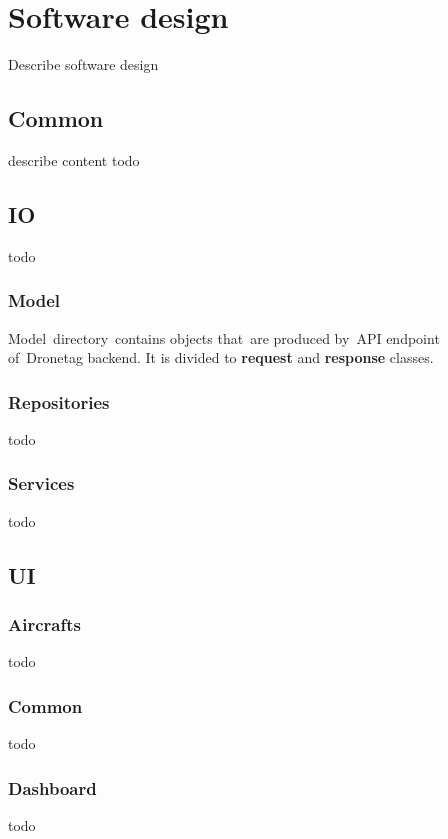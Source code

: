\chapter{Software design}\label{ch:software-design}
Describe software design

\section{Common}\label{sec:common}
describe content
todo

\section{IO}\label{sec:io}
todo

\subsection{Model}\label{subsec:model}
Model~directory~contains objects that~are produced by~API endpoint of~Dronetag backend.
It is divided to \textbf{request} and \textbf{response} classes.

\subsection{Repositories}\label{subsec:respositories}
todo

\subsection{Services}\label{subsec:services}
todo

\section{UI}\label{sec:ui}

\subsection{Aircrafts}\label{subsec:aircrafts}
todo

\subsection{Common}\label{subsec:common}
todo

\subsection{Dashboard}\label{subsec:dashboard}
todo

